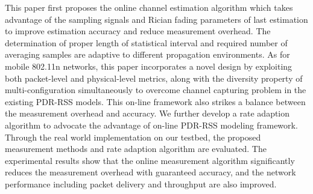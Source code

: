 \begin{englishabstract}
This paper first proposes the online channel estimation algorithm which takes advantage of the sampling signals and Rician fading parameters of last estimation to improve estimation accuracy and reduce measurement overhead. The determination of proper length of statistical interval and required number of averaging samples are adaptive to different propagation environments. As for mobile 802.11n networks, this paper incorporates a novel design by exploiting both packet-level and physical-level metrics, along with the diversity property of multi-configuration simultaneously to overcome channel capturing problem in the existing PDR-RSS models. This on-line framework also strikes a balance between the measurement overhead and accuracy. We further develop a rate adaption algorithm to advocate the advantage of on-line PDR-RSS modeling framework. Through the real world implementation on our testbed, the proposed measurement methods and rate adaption algorithm are evaluated. The experimental results show that the online measurement algorithm significantly reduces the measurement overhead with guaranteed accuracy, and the network performance including packet delivery and throughput are also improved.

\end{englishabstract}
